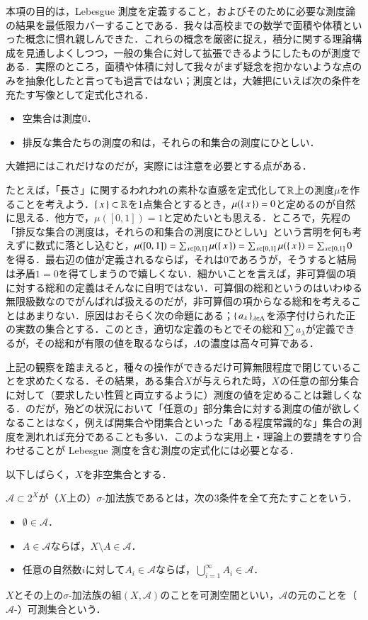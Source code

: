 本項の目的は，Lebesgue 測度を定義すること，およびそのために必要な測度論の結果を最低限カバーすることである．我々は高校までの数学で面積や体積といった概念に慣れ親しんできた．これらの概念を厳密に捉え，積分に関する理論構成を見通しよくしつつ，一般の集合に対して拡張できるようにしたものが測度である．実際のところ，面積や体積に対して我々がまず疑念を抱かないような点のみを抽象化したと言っても過言ではない；測度とは，大雑把にいえば次の条件を充たす写像として定式化される．
\begin{itemize}
\item 空集合は測度0．
\item 排反な集合たちの測度の和は，それらの和集合の測度にひとしい．
\end{itemize}
大雑把にはこれだけなのだが，実際には注意を必要とする点がある．
\begin{que}
たとえば，「長さ」に関するわれわれの素朴な直感を定式化して$\mathbb{R}$上の測度$\mu$を作ることを考えよう．$\set{x} \subset \mathbb{R}$を1点集合とするとき，$\mu(\set{x}) = 0$と定めるのが自然に思える．他方で，$\mu([0,1])=1$と定めたいとも思える．ところで，先程の「排反な集合の測度は，それらの和集合の測度にひとしい」という言明を何も考えずに数式に落とし込むと，$\mu([0,1]) = \sum_{x \in [0,1]} \mu(\set{x}) = \sum_{x \in [0,1]} \mu(\set{x}) = \sum_{x \in [0,1]} 0$を得る．最右辺の値が定義されるならば，それは0であろうが，そうすると結局は矛盾$1=0$を得てしまうので嬉しくない．細かいことを言えば，非可算個の項に対する総和の定義はそんなに自明ではない．可算個の総和というのはいわゆる無限級数なのでがんばれば扱えるのだが，非可算個の項からなる総和を考えることはあまりない．原因はおそらく次の命題にある；$\set{a_\lambda}_{\lambda \in \Lambda}$を添字付けられた正の実数の集合とする．このとき，適切な定義のもとでその総和$\sum a_\lambda$が定義できるが，その総和が有限の値を取るならば，$\Lambda$の濃度は高々可算である．
\end{que}
上記の観察を踏まえると，種々の操作ができるだけ可算無限程度で閉じていることを求めたくなる．その結果，ある集合$X$が与えられた時，$X$の任意の部分集合に対して（要求したい性質と両立するように）測度の値を定めることは難しくなる．のだが，殆どの状況において「任意の」部分集合に対する測度の値が欲しくなることはなく，例えば開集合や閉集合といった「ある程度常識的な」集合の測度を測れれば充分であることも多い．このような実用上・理論上の要請をすり合わせることが Lebesgue 測度を含む測度の定式化には必要となる．

以下しばらく，$X$を非空集合とする．

\begin{defi}
$\mathcal{A} \subset 2^X$が（$X$上の）$\sigma$-加法族であるとは，次の3条件を全て充たすことをいう．

\begin{itemize}
\item $\emptyset \in \mathcal{A}$．
\item $A \in \mathcal{A}$ならば，$X \setminus A \in \mathcal{A}$．
\item 任意の自然数$i$に対して$A_i \in \mathcal{A}$ならば，$\bigcup_{i=1}^\infty A_i \in \mathcal{A}$．
\end{itemize}
$X$とその上の$\sigma$-加法族の組$(X,\mathcal{A})$のことを可測空間といい，$\mathcal{A}$の元のことを（$\mathcal{A}$-）可測集合という．
\end{defi}

